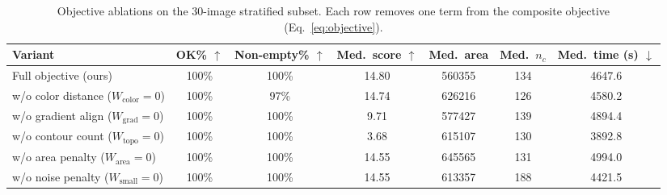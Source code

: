 \begin{table}[t]
\centering
\caption{Objective ablations on the 30-image stratified subset. Each row removes one term from the composite objective (Eq.~\ref{eq:objective}).}
\label{tab:abl_obj}
\begin{tabular}{lcccccc}
\toprule
Variant & OK\% $\uparrow$ & Non-empty\% $\uparrow$ & Med.\ score $\uparrow$ & Med.\ area & Med.\ $n_c$ & Med.\ time (s) $\downarrow$ \\
\midrule
Full objective (ours) & 100\% & 100\% & 14.80 & 560355 & 134 & 4647.6 \\
w/o color distance ($W_{\mathrm{color}}{=}0$) & 100\% & 97\% & 14.74 & 626216 & 126 & 4580.2 \\
w/o gradient align ($W_{\mathrm{grad}}{=}0$) & 100\% & 100\% & 9.71 & 577427 & 139 & 4894.4 \\
w/o contour count ($W_{\mathrm{topo}}{=}0$) & 100\% & 100\% & 3.68 & 615107 & 130 & 3892.8 \\
w/o area penalty ($W_{\mathrm{area}}{=}0$) & 100\% & 100\% & 14.55 & 645565 & 131 & 4994.0 \\
w/o noise penalty ($W_{\mathrm{small}}{=}0$) & 100\% & 100\% & 14.55 & 613357 & 188 & 4421.5 \\
\bottomrule
\end{tabular}
\end{table}
